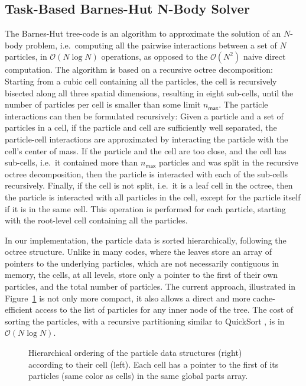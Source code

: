 \documentclass[preprint]{elsarticle}
\newcommand{\oh}[1]
    {\mbox{$ {\mathcal O}( #1 ) $}}
\newcommand{\fig}[1]
    {Figure~\ref{fig:#1}}
\begin{document}
\subsection{Task-Based Barnes-Hut N-Body Solver}

The Barnes-Hut tree-code is an algorithm to approximate the
solution of an $N$-body problem, i.e.~computing all the
pairwise interactions between a set of $N$ particles,
in \oh{N\log N} operations, as opposed to the \oh{N^2}
naive direct computation.
The algorithm is based on a recursive octree decomposition:
Starting from a cubic cell containing all the particles,
the cell is recursively bisected along all three spatial dimensions,
resulting in eight sub-cells, until the number of particles
per cell is smaller than some limit $n_\mathsf{max}$.
The particle interactions can then be formulated recursively:
Given a particle and a set of particles in a cell,
if the particle and cell
are sufficiently well separated, the particle-cell interactions
are approximated by interacting the particle with the cell's
center of mass.
If the particle and the cell are too close, and the cell
has sub-cells, i.e.~it contained more than $n_\mathsf{max}$
particles and was split in the recursive octree decomposition,
then the particle is interacted with each of the sub-cells
recursively.
Finally, if the cell is not split, i.e.~it is a leaf cell
in the octree, then the particle is interacted with all
particles in the cell, except for the particle itself if
it is in the same cell.
This operation is performed for each particle, starting
with the root-level cell containing all the particles.

In our implementation, the particle data is sorted hierarchically,
following the octree structure.
Unlike in many codes, where the leaves store an array of
pointers to the underlying particles, which are not necessarily
contiguous in memory, the cells, at all
levels, store only a pointer to the first of their own particles,
and the total number of particles.
The current approach, illustrated in \fig{CellParts} is not
only more compact, it also allows a direct and more cache-efficient access
to the list of particles for any inner node of the tree.
The cost of sorting the particles, with a recursive
partitioning similar to QuickSort \cite{ref:Hoare1962},
is in \oh{N\log N}.

\begin{figure}
    \centerline{}
    \caption{Hierarchical ordering of the particle data structures
    (right) according to their cell (left).
    Each cell has a pointer to the first of its particles (same color
    as cells) in the same global parts array.}
    \label{fig:CellParts}
\end{figure}
\end{document}
